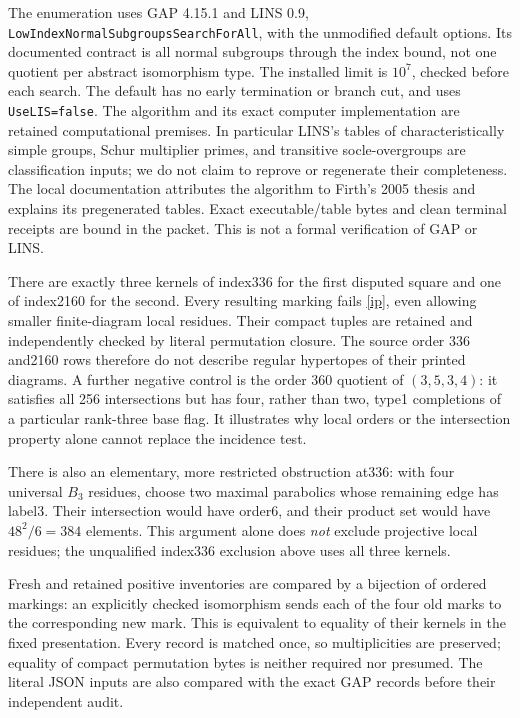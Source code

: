 \documentclass[11pt]{article}
\begin{document}
The enumeration uses GAP 4.15.1 and LINS 0.9,
\texttt{LowIndexNormalSubgroupsSearchForAll}, with the unmodified default
options. Its documented contract is all normal subgroups through the
index bound, not one quotient per abstract isomorphism type. The installed
limit is $10^7$, checked before each search. The default has no early
termination or branch cut, and uses \texttt{UseLIS=false}. The algorithm
and its exact computer implementation are retained computational premises.
In particular LINS's tables of characteristically simple groups, Schur
multiplier primes, and transitive socle-overgroups are classification
inputs; we do not claim to reprove or regenerate their completeness.
The local documentation attributes the algorithm to Firth's 2005 thesis
and explains its pregenerated tables. Exact executable/table bytes and
clean terminal receipts are bound in the packet. This is not a formal
verification of GAP or LINS.

There are exactly three kernels of index336 for the first disputed square
and one of index2160 for the second. Every resulting marking fails
\eqref{ip}, even allowing smaller finite-diagram local residues.
Their compact tuples are retained and independently checked by literal
permutation closure. The source order $336$ and2160 rows therefore do not
describe regular hypertopes of their printed diagrams. A further negative
control is the order $360$ quotient of $(3,5,3,4)$: it satisfies all 256
intersections but has four, rather than two, type1 completions of a
particular rank-three base flag. It illustrates why local orders or the
intersection property alone cannot replace the incidence test.

There is also an elementary, more restricted obstruction at336: with
four universal $B_3$ residues, choose two maximal parabolics whose
remaining edge has label3. Their intersection would have order6, and
their product set would have $48^2/6=384$ elements. This argument alone
does \emph{not} exclude projective local residues; the unqualified
index336 exclusion above uses all three kernels.

Fresh and retained positive inventories are compared by a bijection of
ordered markings: an explicitly checked isomorphism sends each of the four
old marks to the corresponding new mark. This is equivalent to equality
of their kernels in the fixed presentation. Every record is matched once,
so multiplicities are preserved; equality of compact permutation bytes
is neither required nor presumed. The literal JSON inputs are also compared
with the exact GAP records before their independent audit.
\end{document}
